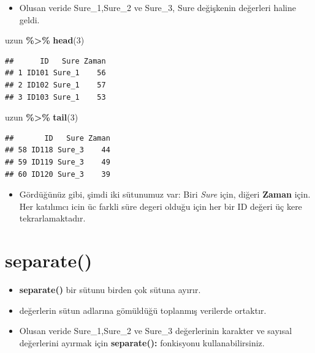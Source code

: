 \documentclass[
  oneside]{book}
\newenvironment{Shaded}{\begin{snugshade}}{\end{snugshade}}
\newcommand{\DecValTok}[1]{\textcolor[rgb]{0.00,0.00,0.81}{#1}}
\newcommand{\FunctionTok}[1]{\textcolor[rgb]{0.13,0.29,0.53}{\textbf{#1}}}
\newcommand{\NormalTok}[1]{#1}
\newcommand{\SpecialCharTok}[1]{\textcolor[rgb]{0.81,0.36,0.00}{\textbf{#1}}}
\providecommand{\tightlist}{%
  \setlength{\itemsep}{0pt}\setlength{\parskip}{0pt}}
\begin{document}
\begin{itemize}
\tightlist
\item
  Olusan veride Sure\_1,Sure\_2 ve Sure\_3, Sure değişkenin değerleri haline geldi.
\end{itemize}

\begin{Shaded}
\begin{Highlighting}[]
\NormalTok{uzun }\SpecialCharTok{\%\textgreater{}\%} \FunctionTok{head}\NormalTok{(}\DecValTok{3}\NormalTok{)}
\end{Highlighting}
\end{Shaded}

\begin{verbatim}
##      ID   Sure Zaman
## 1 ID101 Sure_1    56
## 2 ID102 Sure_1    57
## 3 ID103 Sure_1    53
\end{verbatim}

\begin{Shaded}
\begin{Highlighting}[]
\NormalTok{uzun }\SpecialCharTok{\%\textgreater{}\%} \FunctionTok{tail}\NormalTok{(}\DecValTok{3}\NormalTok{)}
\end{Highlighting}
\end{Shaded}

\begin{verbatim}
##       ID   Sure Zaman
## 58 ID118 Sure_3    44
## 59 ID119 Sure_3    49
## 60 ID120 Sure_3    39
\end{verbatim}

\begin{itemize}
\tightlist
\item
  Gördüğünüz gibi, şimdi iki sütunumuz var: Biri \emph{Sure} için, diğeri \textbf{Zaman} için. Her katılımcı icin üc farkli süre degeri olduğu için her bir ID değeri üç kere tekrarlamaktadır.
\end{itemize}

\hypertarget{separate}{%
\section{\texorpdfstring{\textbf{separate()}}{separate()}}\label{separate}}

\begin{itemize}
\item
  \textbf{separate()} bir sütunu birden çok sütuna ayırır.
\item
  değerlerin sütun adlarına gömüldüğü toplanmış verilerde ortaktır.
\item
  Olusan veride Sure\_1,Sure\_2 ve Sure\_3 değerlerinin karakter ve sayısal değerlerini ayırmak için \textbf{separate():} fonkisyonu kullanabilirsiniz.
\end{itemize}
\end{document}
